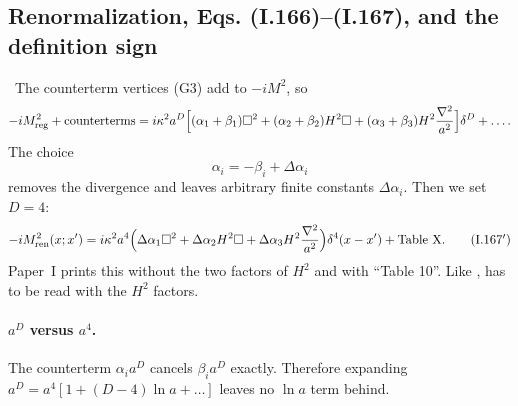 \subsection{Renormalization, Eqs. (I.166)--(I.167), and the definition sign}
\label{sec:ch08-defsign}
\tD\ The counterterm vertices (G3) add to $-iM^2$, so
\[
-iM^2_{\rm reg}+\text{counterterms}=i\kappa^2a^D\Big[(\alpha_1+\beta_1)\square^2+(\alpha_2+\beta_2)H^2\square+(\alpha_3+\beta_3)H^2\frac{\nabla^2}{a^2}\Big]\delta^D+\ldots .
\]
The choice
\begin{equation}
\alpha_i=-\beta_i+\Delta\alpha_i
\tag{I.166}
\end{equation}
removes the divergence and leaves arbitrary finite constants $\Delta\alpha_i$. Then we set $D=4$:
\begin{equation}
-iM^2_{\rm ren}(x;x')=i\kappa^2a^4\Big(\Delta\alpha_1\square^2+\Delta\alpha_2H^2\square+\Delta\alpha_3H^2\frac{\nabla^2}{a^2}\Big)\delta^4(x-x')+\text{Table X}.
\tag{I.167$'$}
\end{equation}
Paper~I prints this without the two factors of $H^2$ and with ``Table 10''. Like ,  has to be read with the $H^2$ factors.

\paragraph{$a^D$ versus $a^4$.} The counterterm $\alpha_ia^D$ cancels $\beta_ia^D$ exactly. Therefore expanding $a^D=a^4[1+(D-4)\ln a+\ldots]$ leaves no $\ln a$ term behind.

